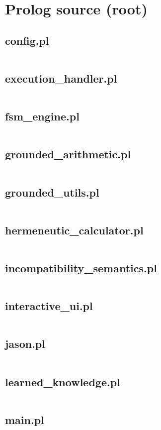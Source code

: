 \documentclass{article}
\begin{document}
\section{Prolog source (root)}
\subsection{config.pl}
\inputminted{prolog}{config.pl}
\subsection{execution\_handler.pl}
\inputminted{prolog}{execution_handler.pl}
\subsection{fsm\_engine.pl}
\inputminted{prolog}{fsm_engine.pl}
\subsection{grounded\_arithmetic.pl}
\inputminted{prolog}{grounded_arithmetic.pl}
\subsection{grounded\_utils.pl}
\inputminted{prolog}{grounded_utils.pl}
\subsection{hermeneutic\_calculator.pl}
\inputminted{prolog}{hermeneutic_calculator.pl}
\subsection{incompatibility\_semantics.pl}
\inputminted{prolog}{incompatibility_semantics.pl}
\subsection{interactive\_ui.pl}
\inputminted{prolog}{interactive_ui.pl}
\subsection{jason.pl}
\inputminted{prolog}{jason.pl}
\subsection{learned\_knowledge.pl}
\inputminted{prolog}{learned_knowledge.pl}
\subsection{main.pl}
\inputminted{prolog}{main.pl}
\end{document}
